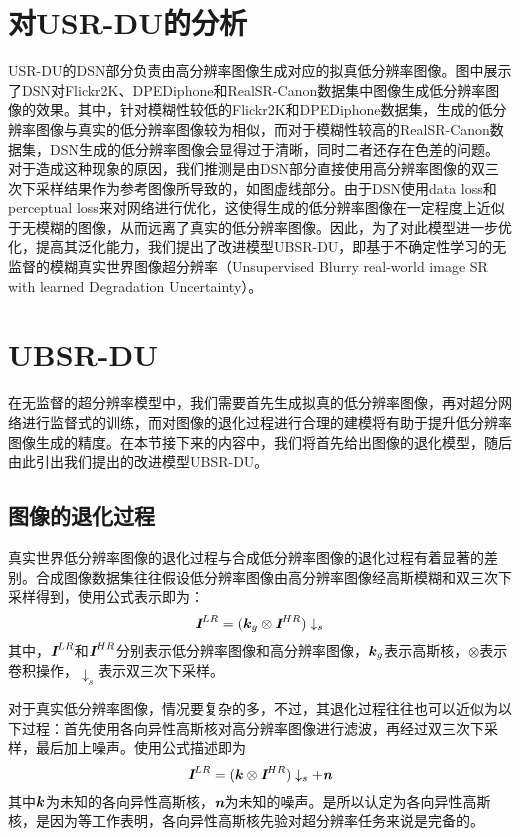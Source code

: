 \section{对USR-DU的分析}
USR-DU的DSN部分负责由高分辨率图像生成对应的拟真低分辨率图像。图中展示了DSN对Flickr2K、DPEDiphone和RealSR-Canon数据集中图像生成低分辨率图像的效果。其中，针对模糊性较低的Flickr2K和DPEDiphone数据集，生成的低分辨率图像与真实的低分辨率图像较为相似，而对于模糊性较高的RealSR-Canon数据集，DSN生成的低分辨率图像会显得过于清晰，同时二者还存在色差的问题。对于造成这种现象的原因，我们推测是由DSN部分直接使用高分辨率图像的双三次下采样结果作为参考图像所导致的，如图虚线部分。由于DSN使用data loss和perceptual loss来对网络进行优化，这使得生成的低分辨率图像在一定程度上近似于无模糊的图像，从而远离了真实的低分辨率图像。因此，为了对此模型进一步优化，提高其泛化能力，我们提出了改进模型UBSR-DU，即基于不确定性学习的无监督的模糊真实世界图像超分辨率（Unsupervised Blurry real-world image SR with learned Degradation Uncertainty）。
\section{UBSR-DU}
在无监督的超分辨率模型中，我们需要首先生成拟真的低分辨率图像，再对超分网络进行监督式的训练，而对图像的退化过程进行合理的建模将有助于提升低分辨率图像生成的精度。在本节接下来的内容中，我们将首先给出图像的退化模型，随后由此引出我们提出的改进模型UBSR-DU。
\subsection{图像的退化过程}
真实世界低分辨率图像的退化过程与合成低分辨率图像的退化过程有着显著的差别。合成图像数据集往往假设低分辨率图像由高分辨率图像经高斯模糊和双三次下采样得到，使用公式表示即为：
\begin{equation}
    \textbf{\em I}^{LR}=(\vb*{k}_g\otimes \textbf{\em I}^{HR})\downarrow_s
\end{equation}
其中，$\textbf{\em I}^{LR}$和$\textbf{\em I}^{HR}$分别表示低分辨率图像和高分辨率图像，$\vb*{k}_g$表示高斯核，$\otimes$表示卷积操作，$\downarrow_s$表示双三次下采样。

对于真实低分辨率图像，情况要复杂的多，不过，其退化过程往往也可以近似为以下过程：首先使用各向异性高斯核对高分辨率图像进行滤波，再经过双三次下采样，最后加上噪声。使用公式描述即为
\begin{equation}
    \textbf{\em I}^{LR}=(\vb*{k}\otimes \textbf{\em I}^{HR})\downarrow_s+\textbf{\em n}
\end{equation}
其中$\vb*{k}$为未知的各向异性高斯核，$\textbf{\em n}$为未知的噪声。是所以认定为各向异性高斯核，是因为等工作表明，各向异性高斯核先验对超分辨率任务来说是完备的。

